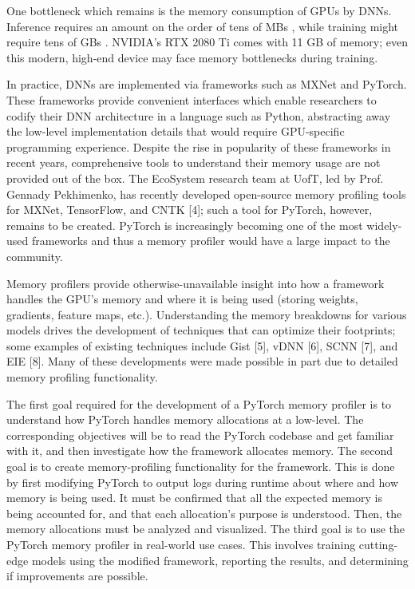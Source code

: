 \documentclass[12pt,letterpaper]{article}
\begin{document}
One bottleneck which remains is the memory consumption of GPUs by DNNs. Inference requires an amount on the order of tens of MBs \cite{deep_compression}, while training might require tens of GBs \cite{vdnn}. NVIDIA’s RTX 2080 Ti comes with 11 GB of memory; even this modern, high-end device may face memory bottlenecks during training. \par 

In practice, DNNs are implemented via frameworks such as MXNet and PyTorch. These frameworks provide convenient interfaces which enable researchers to codify their DNN architecture in a language such as Python, abstracting away the low-level implementation details that would require GPU-specific programming experience. Despite the rise in popularity of these frameworks in recent years, comprehensive tools to understand their memory usage are not provided out of the box. The EcoSystem research team at UofT, led by Prof. Gennady Pekhimenko, has recently developed open-source memory profiling tools for MXNet, TensorFlow, and CNTK [4]; such a tool for PyTorch, however, remains to be created. PyTorch is increasingly becoming one of the most widely-used frameworks and thus a memory profiler would have a large impact to the community.
\par

Memory profilers provide otherwise-unavailable insight into how a framework handles the GPU’s memory and where it is being used (storing weights, gradients, feature maps, etc.). Understanding the memory breakdowns for various models drives the development of techniques that can optimize their footprints; some examples of existing techniques include Gist [5], vDNN [6], SCNN [7], and EIE [8]. Many of these developments were made possible in part due to detailed memory profiling functionality. 
\par

The first goal required for the development of a PyTorch memory profiler is to understand how PyTorch handles memory allocations at a low-level. The corresponding objectives will be to read the PyTorch codebase and get familiar with it, and then investigate how the framework allocates memory. The second goal is to create memory-profiling functionality for the framework. This is done by first modifying PyTorch to output logs during runtime about where and how memory is being used. It must be confirmed that all the expected memory is being accounted for, and that each allocation’s purpose is understood. Then, the memory allocations must be analyzed and visualized. The third goal is to use the PyTorch memory profiler in real-world use cases. This involves training cutting-edge models using the modified framework, reporting the results, and determining if improvements are possible.
\par
\end{document}
